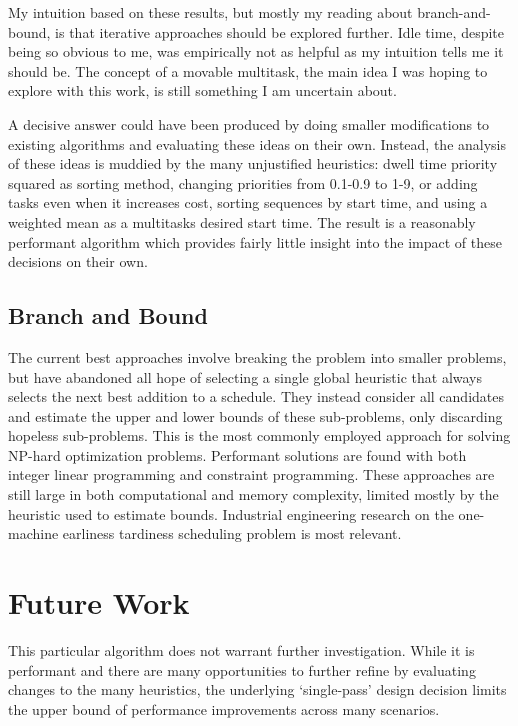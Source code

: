 \documentclass[conference]{IEEEtran}
\begin{document}
My intuition based on these results, but mostly my reading about branch-and-bound, is that iterative approaches should be explored further.
Idle time, despite being so obvious to me, was empirically not as helpful as my intuition tells me it should be.
The concept of a movable multitask, the main idea I was hoping to explore with this work, is still something I am uncertain about.

A decisive answer could have been produced by doing smaller modifications to existing algorithms and evaluating these ideas on their own.
Instead, the analysis of these ideas is muddied by the many unjustified heuristics: dwell time priority squared as sorting method, changing priorities from 0.1-0.9 to 1-9, or adding tasks even when it increases cost, sorting sequences by start time, and using a weighted mean as a multitasks desired start time.
The result is a reasonably performant algorithm which provides fairly little insight into the impact of these decisions on their own.

\subsection{Branch and Bound}

The current best approaches involve breaking the problem into smaller problems, but have abandoned all hope of selecting a single global heuristic that always selects the next best addition to a schedule.
They instead consider all candidates and estimate the upper and lower bounds of these sub-problems, only discarding hopeless sub-problems.
This is the most commonly employed approach for solving NP-hard optimization problems.
Performant solutions are found with both integer linear programming and constraint programming.
These approaches are still large in both computational and memory complexity, limited mostly by the heuristic used to estimate bounds.
Industrial engineering research on the one-machine earliness tardiness scheduling problem is most relevant.

\section{Future Work}

This particular algorithm does not warrant further investigation.
While it is performant and there are many opportunities to further refine by evaluating changes to the many heuristics,
the underlying `single-pass' design decision limits the upper bound of performance improvements across many scenarios.
\end{document}
